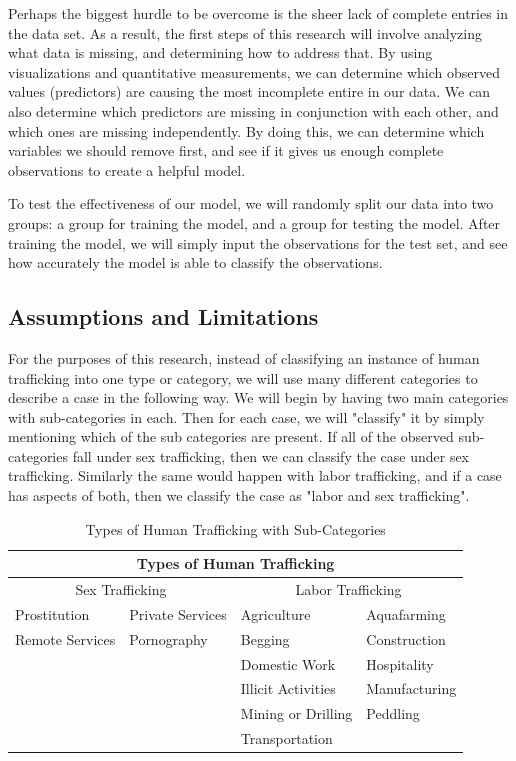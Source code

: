 \documentclass{article} %
\begin{document}
Perhaps the biggest hurdle to be overcome is the sheer lack of complete entries in the data set. As a result, the first steps of this research will involve analyzing what data is missing, and determining how to address that. By using visualizations and quantitative measurements, we can determine which observed values (predictors) are causing the most incomplete entire in our data. We can also determine which predictors are missing in conjunction with each other, and which ones are missing independently. By doing this, we can determine which variables we should remove first, and see if it gives us enough complete observations to create a helpful model.

To test the effectiveness of our model, we will randomly split our data into two groups: a group for training the model, and a group for testing the model. After training the model, we will simply input the observations for the test set, and see how accurately the model is able to classify the observations.

\subsection{Assumptions and Limitations}


For the purposes of this research, instead of classifying an instance of human trafficking into one type or category, we will use many different categories to describe a case in the following way. We will begin by having two main categories with sub-categories in each. Then for each case, we will "classify" it by simply mentioning which of the sub categories are present. If all of the observed sub-categories fall under sex trafficking, then we can classify the case under sex trafficking. Similarly the same would happen with labor trafficking, and if a case has aspects of both, then we classify the case as "labor and sex trafficking".

\FloatBarrier
\begin{table}[htb]
	\begin{tabular}{ |p{3cm}|p{3cm}||p{3cm}|p{3cm}|  }
		\hline
		\multicolumn{4}{|c|}{Types of Human Trafficking}                                 \\ \hline
		\multicolumn{2}{|c||}{Sex Trafficking} & \multicolumn{2}{|c|}{Labor Trafficking} \\ \hline
		Prostitution    & Private Services     & Agriculture        & Aquafarming        \\
		Remote Services & Pornography          & Begging            & Construction       \\
		&                      & Domestic Work      & Hospitality        \\
		&                      & Illicit Activities & Manufacturing      \\
		&                      & Mining or Drilling & Peddling           \\
		&                      & Transportation     &                    \\ \hline
	\end{tabular}
	\caption{Types of Human Trafficking with Sub-Categories}
\end{table}
\FloatBarrier
\end{document}

